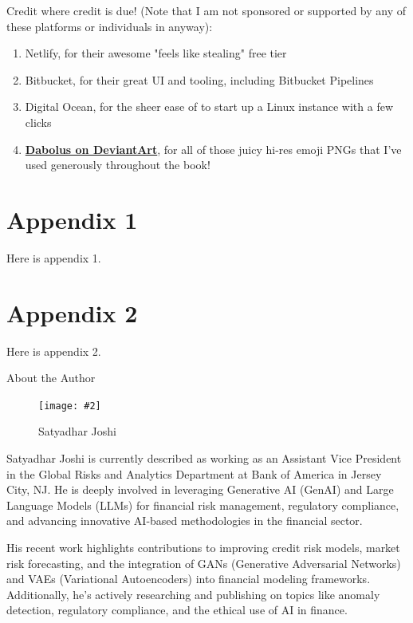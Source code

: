 \documentclass[a4paper,headinclude=on,footinclude=on,12pt,oneside]{scrbook}
\newcommand{\link}[2]{\textbf{\textcolor{monokaiPink}{\href{#2}{#1}}}}
\newcommand{\standardfigure}[3]{\begin{figure}[H]\begin{center}\texttt{[image: \#2]}\caption{#3}\label{fig:#2}\end{center}\end{figure}}
\begin{document}
Credit where credit is due! (Note that I am not sponsored or supported by any of these platforms or individuals in anyway):

\begin{enumerate}
\item Netlify, for their awesome "feels like stealing" free tier
\item Bitbucket, for their great UI and tooling, including Bitbucket Pipelines
\item Digital Ocean, for the sheer ease of to start up a Linux instance with a few clicks
\item \link{Dabolus on DeviantArt}{https://www.deviantart.com/dabolus}, for all of those juicy hi-res emoji PNGs that I've used generously throughout the book!
\end{enumerate}

\begin{appendices}

\chapter{Appendix 1}

Here is appendix 1.

\chapter{Appendix 2}

Here is appendix 2.

\end{appendices}

\printindex
{}


About the Author

\standardfigure{\textwidth/2}{about/author_joshi}{Satyadhar Joshi}

Satyadhar Joshi is currently described as working as an Assistant Vice President in the Global Risks and Analytics Department at Bank of America in Jersey City, NJ. He is deeply involved in leveraging Generative AI (GenAI) and Large Language Models (LLMs) for financial risk management, regulatory compliance, and advancing innovative AI-based methodologies in the financial sector.

His recent work highlights contributions to improving credit risk models, market risk forecasting, and the integration of GANs (Generative Adversarial Networks) and VAEs (Variational Autoencoders) into financial modeling frameworks. Additionally, he's actively researching and publishing on topics like anomaly detection, regulatory compliance, and the ethical use of AI in finance.
\end{document}
